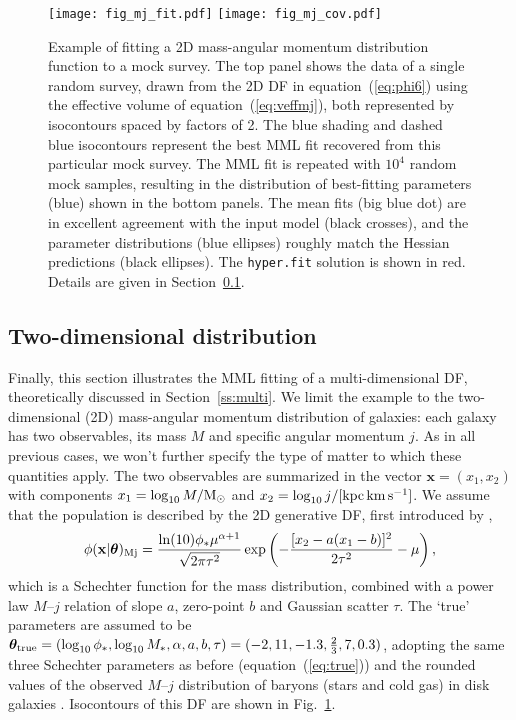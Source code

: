 \documentclass[a4paper,fleqn,usenatbib]{mnras}
\newcommand{\be}{\begin{equation}}
\newcommand{\ee}{\end{equation}}
\newcommand{\msun}{{\rm M}_{\odot}}
\newcommand{\hyperfit}{\texttt{hyper.fit}\xspace}
\newcommand{\x}{\mathbf{x}}
\newcommand{\unitj}{{\rm kpc\,km\,s^{-1}}}
\newcommand{\fig}[1]{Fig.~\ref{fig:#1}}
\newcommand{\eq}[1]{equation~(\ref{eq:#1})}
\renewcommand{\ss}[1]{Section~\ref{ss:#1}}
\newcommand{\para}{{\bm{\theta}}}
\begin{document}
\begin{figure}
\begin{center}
\texttt{[image: fig\_mj\_fit.pdf]}\vspace{-0.1cm}
\texttt{[image: fig\_mj\_cov.pdf]}\vspace{-0.3cm}
\caption{Example of fitting a 2D mass-angular momentum distribution function to a mock survey. The top panel shows the data of a single random survey, drawn from the 2D DF in \eq{phi6} using the effective volume of \eq{veffmj}, both represented by isocontours spaced by factors of 2. The blue shading and dashed blue isocontours represent the best MML fit recovered from this particular mock survey. The MML fit is repeated with $10^4$ random mock samples, resulting in the distribution of best-fitting parameters (blue) shown in the bottom panels. The mean fits (big blue dot) are in excellent agreement with the input model (black crosses), and the parameter distributions (blue ellipses) roughly match the Hessian predictions (black ellipses). The \hyperfit solution is shown in red. Details are given in \ss{2dexample}.\vspace{-0.3cm}}\label{fig:mj}
\end{center}
\end{figure}

\subsection{Two-dimensional distribution}\label{ss:2dexample}

Finally, this section illustrates the MML fitting of a multi-dimensional DF, theoretically discussed in \ss{multi}. We limit the example to the two-dimensional (2D) mass-angular momentum distribution of galaxies: each galaxy has two observables, its mass $M$ and specific angular momentum $j$. As in all previous cases, we won't further specify the type of matter to which these quantities apply. The two observables are summarized in the vector $\x=(x_1,x_2)$ with components $x_1=\log_{10}{M/\msun}$ and $x_2=\log_{10}{j/[\unitj]}$. We assume that the population is described by the 2D generative DF, first introduced by \cite{Choloniewski1985},
%
\be\label{eq:phi6}
	\phi(\x|\para)_{\rm Mj} = \frac{\ln(10)\phi_\ast\mu^{\alpha+1}}{\sqrt{2\pi\tau^2}}\exp\left(-\frac{[x_2-a(x_1-b)]^2}{2\tau^2}-\mu\right),
\ee
%
which is a Schechter function for the mass distribution, combined with a power law $M$--$j$ relation of slope $a$, zero-point $b$ and Gaussian scatter $\tau$. The `true' parameters are assumed to be $\para_{\rm true}=(\log_{10}\phi_\ast,\log_{10}M_\ast,\alpha,a,b,\tau)=(-2,11,-1.3,\frac{2}{3},7,0.3)$, adopting the same three Schechter parameters as before (\eq{true}) and the rounded values of the observed $M$--$j$ distribution of baryons (stars and cold gas) in disk galaxies \citep{Obreschkow2014}. Isocontours of this DF are shown in \fig{mj}.
\end{document}
